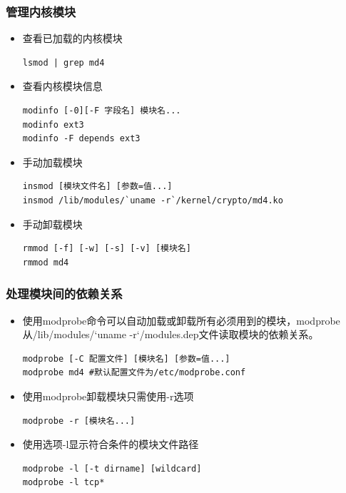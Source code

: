 \documentclass[xcolor=svgnames,presentation]{beamer}
\begin{document}
\begin{frame}[fragile]
\frametitle{管理内核模块}
\label{sec-2-4}
\begin{itemize}

\item 查看已加载的内核模块\\
\label{sec-2-4-1}%
\begin{verbatim}
lsmod | grep md4
\end{verbatim}

\item 查看内核模块信息\\
\label{sec-2-4-2}%
\begin{verbatim}
modinfo [-0][-F 字段名] 模块名...
modinfo ext3
modinfo -F depends ext3
\end{verbatim}

\item 手动加载模块\\
\label{sec-2-4-3}%
\begin{verbatim}
insmod [模块文件名] [参数=值...]
insmod /lib/modules/`uname -r`/kernel/crypto/md4.ko
\end{verbatim}

\item 手动卸载模块\\
\label{sec-2-4-4}%
\begin{verbatim}
rmmod [-f] [-w] [-s] [-v] [模块名]
rmmod md4
\end{verbatim}
\end{itemize} %
\end{frame}
\begin{frame}[fragile]
\frametitle{处理模块间的依赖关系}
\label{sec-2-5}
\begin{itemize}

\item 使用modprobe命令可以自动加载或卸载所有必须用到的模块，modprobe从/lib/modules/`uname -r`/modules.dep文件读取模块的依赖关系。\\
\label{sec-2-5-1}%
\begin{verbatim}
modprobe [-C 配置文件] [模块名] [参数=值...]
modprobe md4 #默认配置文件为/etc/modprobe.conf
\end{verbatim}

\item 使用modprobe卸载模块只需使用-r选项\\
\label{sec-2-5-2}%
\begin{verbatim}
modprobe -r [模块名...]
\end{verbatim}

\item 使用选项-l显示符合条件的模块文件路径\\
\label{sec-2-5-3}%
\begin{verbatim}
modprobe -l [-t dirname] [wildcard]
modprobe -l tcp*
\end{verbatim}
\end{itemize} %
\end{frame}
\end{document}
